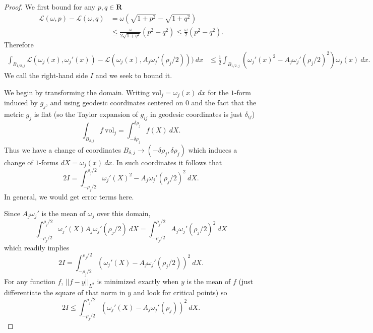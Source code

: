 \documentclass[reqno,12pt,letterpaper]{amsart}
\newcommand{\RR}{\mathbf{R}}
\newcommand{\vol}{\mathrm{vol}}
\theoremstyle{definition}
\numberwithin{equation}{section}
\begin{document}
\begin{proof}
We first bound for any $p, q \in \RR$
\begin{align*}
\mathscr L(\omega, p) - \mathscr L(\omega, q) &= \omega(\sqrt{1 + p^2} - \sqrt{1 + q^2}) \\
&\leq \frac{\omega}{2\sqrt{1 + q^2}}(p^2 - q^2) \leq \frac{\omega}{2}(p^2 - q^2).
\end{align*}
Therefore
\begin{align*}
\int_{B_{1/2,j}} \mathscr L(\omega_j(x), \omega_j'(x)) - \mathscr L(\omega_j(x),  A_j \omega_j'(\rho_j/2))) ~dx &\leq \frac{1}{2} \int_{B_{1/2,j}} (\omega_j'(x)^2 -  A_j \omega_j'(\rho_j/2)^2 ) \omega_j(x) ~dx.
\end{align*}
We call the right-hand side $I$ and we seek to bound it.

We begin by transforming the domain.
Writing $\vol_j = \omega_j(x) ~dx$ for the $1$-form induced by $g_j$, and using geodesic coordinates centered on $0$ and the fact that the metric $g_j$ is flat (so the Taylor expansion of $g_{ij}$ in geodesic coordinates is just $\delta_{ij}$)
$$\int_{B_{\delta,j}} f ~\vol_j = \int_{-\delta \rho_j}^{\delta \rho_j} f(X) ~dX.$$
Thus we have a change of coordinates $B_{\delta, j } \to (-\delta \rho_j, \delta \rho_j)$ which induces a change of $1$-forms $dX = \omega_j(x) ~dx$.
In such coordinates it follows that
$$2I = \int_{-\rho_j/2}^{\rho_j/2} \omega_j'(X)^2 -  A_j \omega_j'(\rho_j/2)^2 ~dX.$$
In general, we would get error terms here.

Since $A_j \omega_j'$ is the mean of $\omega_j$ over this domain,
$$\int_{-\rho_j/2}^{\rho_j/2} \omega_j'(X) A_j \omega_j'(\rho_j/2) ~dX = \int_{-\rho_j/2}^{\rho_j/2} A_j \omega_j'(\rho_j/2)^2 ~dX$$
which readily implies
$$2I = \int_{-\rho_j/2}^{\rho_j/2} (\omega_j'(X) -  A_j \omega_j'(\rho_j/2))^2 ~dX.$$
For any function $f$, $||f - y||_{L^2}$ is minimized exactly when $y$ is the mean of $f$ (just differentiate the square of that norm in $y$ and look for critical points) so
$$2I \leq \int_{-\rho_j/2}^{\rho_j/2} (\omega_j'(X) -  A_j \omega_j'(\rho_j))^2 ~dX.$$


\end{proof}
\end{document}
